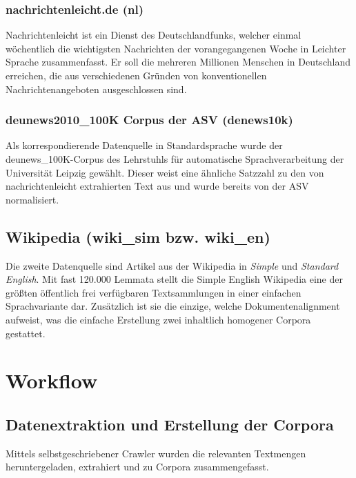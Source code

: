\documentclass[11pt, a4paper]{article}
\begin{document}
\subsubsection{nachrichtenleicht.de (nl)}

Nachrichtenleicht ist ein Dienst des Deutschlandfunks, welcher einmal
w\"ochentlich die wichtigsten Nachrichten der vorangegangenen Woche in Leichter
Sprache zusammenfasst. Er soll die mehreren Millionen Menschen in Deutschland
erreichen, die aus verschiedenen Gr\"unden von konventionellen
Nachrichtenangeboten ausgeschlossen sind.

\subsubsection{deunews2010\_100K Corpus der ASV (denews10k)}

Als korrespondierende Datenquelle in Standardsprache wurde der
deunews\_100K-Corpus des Lehrstuhls f\"ur automatische Sprachverarbeitung
der Universit\"at Leipzig gew\"ahlt. Dieser weist eine \"ahnliche Satzzahl zu
den von nachrichtenleicht extrahierten Text aus und wurde bereits von der ASV
normalisiert.

\subsection{Wikipedia (wiki\_sim bzw. wiki\_en)}

Die zweite Datenquelle sind Artikel aus der Wikipedia in \emph{Simple} und
\emph{Standard English}. Mit fast 120.000 Lemmata stellt die Simple English
Wikipedia eine der gr\"o\ss{}ten \"offentlich frei verf\"ugbaren Textsammlungen
in einer einfachen Sprachvariante dar. Zus\"atzlich ist sie die
einzige, welche Dokumentenalignment aufweist, was die einfache Erstellung zwei
inhaltlich homogener Corpora gestattet.


\section{Workflow}

\subsection{Datenextraktion und Erstellung der Corpora}
\label{datextr}

Mittels selbstgeschriebener Crawler wurden die relevanten Textmengen
heruntergeladen, extrahiert und zu Corpora zusammengefasst.
\end{document}
